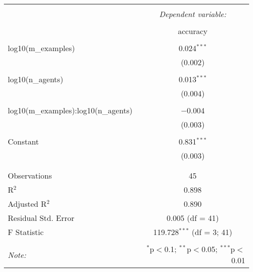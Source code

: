 
\begin{table}[!htbp] \centering 
  \caption{} 
  \label{tab:model_summary} 
\begin{tabular}{@{\extracolsep{5pt}}lc} 
\\[-1.8ex]\hline 
\hline \\[-1.8ex] 
 & \multicolumn{1}{c}{\textit{Dependent variable:}} \\ 
\cline{2-2} 
\\[-1.8ex] & accuracy \\ 
\hline \\[-1.8ex] 
 log10(m\_examples) & 0.024$^{***}$ \\ 
  & (0.002) \\ 
  & \\ 
 log10(n\_agents) & 0.013$^{***}$ \\ 
  & (0.004) \\ 
  & \\ 
 log10(m\_examples):log10(n\_agents) & $-$0.004 \\ 
  & (0.003) \\ 
  & \\ 
 Constant & 0.831$^{***}$ \\ 
  & (0.003) \\ 
  & \\ 
\hline \\[-1.8ex] 
Observations & 45 \\ 
R$^{2}$ & 0.898 \\ 
Adjusted R$^{2}$ & 0.890 \\ 
Residual Std. Error & 0.005 (df = 41) \\ 
F Statistic & 119.728$^{***}$ (df = 3; 41) \\ 
\hline 
\hline \\[-1.8ex] 
\textit{Note:}  & \multicolumn{1}{r}{$^{*}$p$<$0.1; $^{**}$p$<$0.05; $^{***}$p$<$0.01} \\ 
\end{tabular} 
\end{table} 
